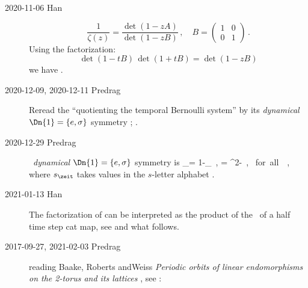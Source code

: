 \begin{description}
    \item[2020-11-06 Han]
\[
\frac{1}{\zeta(z)} = \frac{\det(1-zA)}{\det(1-zB)} \, , \quad
B=
\left(\begin{array}{cc}
 1 & 0 \\
 0 & 1
  \end{array} \right)
  \,.
\]
Using the factorization:
\[
\det(1-tB)\,\det(1+tB)
    =  {\det(1-zB)}
\]
we have .

    \item[2020-12-09, 2020-12-11 Predrag]
Reread the ``quotienting the temporal Bernoulli system''
 by its \emph{dynamical} $\Dn{1}=\{e,\Refl\}$
symmetry ; .

    \item[2020-12-29 Predrag]
\tempLatt\ \emph{dynamical} $\Dn{1}=\{e,\Refl\}$
symmetry is 
\beq
\Refl \ssp_\zeit = 1-\ssp_\zeit
    \,,\quad
\Refl \Ssym{\zeit} = \mu^2-\Ssym{\zeit}
    \,,\qquad
\mbox{ for all } \zeit\in\integers
\,,
where $\Ssym{\zeit}$ takes values in the ${s}$-letter alphabet
.

    \item[2021-01-13 Han]
The factorization of  can be interpreted as the product
of the \tzeta\ of a half time step cat map, see
 and what follows.

 \item[2017-09-27, 2021-02-03 Predrag] reading
 Baake, Roberts andWeiss
{\em Periodic orbits of linear endomorphisms on the 2-torus and its lattices}
, see :



\end{description}
